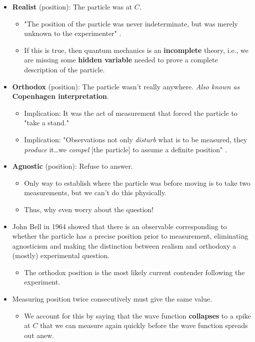 \documentclass[../notes.tex]{subfiles}
\begin{document}
\begin{itemize}
    \item \textbf{Realist} (position): The particle was at $C$.
    \begin{itemize}
        \item "The position of the particle was never indeterminate, but was merely unknown to the experimenter" \parencite[17]{bib:Griffiths}.
        \item If this is true, then quantum mechanics is an \textbf{incomplete} theory, i.e., we are missing some \textbf{hidden variable} needed to prove a complete description of the particle.
    \end{itemize}
    \item \textbf{Orthodox} (position): The particle wasn't really anywhere. \emph{Also known as} \textbf{Copenhagen interpretation}.
    \begin{itemize}
        \item Implication: It was the act of measurement that forced the particle to "take a stand."
        \item Implication: "Observations not only \emph{disturb} what is to be measured, they \emph{produce} it\dots we \emph{compel} [the particle] to assume a definite position" \parencite[17]{bib:Griffiths}.
    \end{itemize}
    \item \textbf{Agnostic} (position): Refuse to answer.
    \begin{itemize}
        \item Only way to establish where the particle was before moving is to take two measurements, but we can't do this physically.
        \item Thus, why even worry about the question!
    \end{itemize}
    \item John Bell in 1964 showed that there is an observable corresponding to whether the particle has a precise position prior to measurement, eliminating agnosticism and making the distinction between realism and orthodoxy a (mostly) experimental question.
    \begin{itemize}
        \item The orthodox position is the most likely current contender following the experiment.
    \end{itemize}
    \item Measuring position twice consecutively must give the same value.
    \begin{itemize}
        \item We account for this by saying that the wave function \textbf{collapses} to a spike at $C$ that we can measure again quickly before the wave function spreads out anew.

\end{itemize}
\end{itemize}
\end{document}

